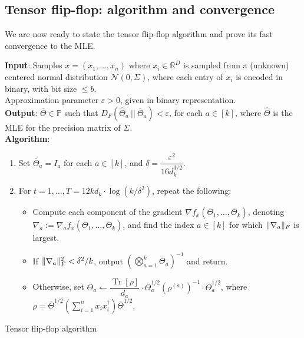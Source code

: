 \documentclass[aos]{imsart}
\theoremstyle{definition}
\numberwithin{equation}{section}
\DeclareMathOperator{\tr}{Tr}
\DeclarePairedDelimiter{\norm}{\lVert}{\rVert}
\newcommand{\R}{{\mathbb{R}}}
\newcommand{\otheta}{\overline{\Theta}}
\newcommand{\htheta}{\widehat{\Theta}}
\newcommand{\eps}{\varepsilon}
\newcommand{\cN}{\mathcal{N}}
\newcommand{\SPD}{\mathbb{P}}
\newcommand{\samp}{x}
\begin{document}
\subsection{Tensor flip-flop: algorithm and convergence}

We are now ready to state the tensor flip-flop algorithm and prove its fast convergence to the MLE.

\begin{Algorithm}
\textbf{Input}: Samples $\samp = (\samp_1, \ldots, \samp_n)$ where $\samp_i \in \R^D$ is sampled from a (unknown) centered normal distribution $\cN(0, \Sigma)$, where each entry of $\samp_i$ is encoded in binary, with bit size $\le b$. \\ Approximation parameter $\eps > 0$, given in binary representation. \\[.3ex]

\textbf{Output}: $\otheta \in \SPD$ such that $D_F(\htheta_a \ || \ \otheta_a) < \eps$, for each $a \in [k]$, where $\htheta$ is the MLE for the precision matrix of $\Sigma$. \\[.3ex]

\textbf{Algorithm}:
\begin{enumerate}
\item\label{it:flip-flop step 1} Set $\otheta_a = I_a$ for each $a \in [k]$, and $\delta = \dfrac{\eps^2}{16 d_k^{3/2}}$.
\item\label{it:flip-flop step 2} For $t=1,\dots,T = 12 k d_k \cdot \log(k/\delta^2)$, repeat the following:
\begin{itemize}
\item Compute each component of the gradient $\nabla f_{\samp}(\otheta_1, \ldots, \otheta_k)$, denoting $\nabla_a := \nabla_a f_{\samp}(\otheta_1, \ldots, \otheta_k)$, and find the index $a \in [k]$ for which $\norm{\nabla_a}_F$ is largest.
\item
If $\norm{\nabla_a}_F^2 < \delta^2/k$, output $\left( \bigotimes_{a =1}^k \otheta_a \right)^{-1}$ and return.
\item Otherwise, set $\otheta_a \leftarrow  \dfrac{\tr[\rho]}{d_a} \cdot \otheta_a^{1/2} (\rho^{(a)})^{-1} \cdot \otheta_a^{1/2}$, where $\rho = \otheta^{1/2} \left( \sum_{i=1}^n x_ix_i^\dagger \right) \otheta^{1/2}.$
\end{itemize}
\end{enumerate}
\caption{Tensor flip-flop algorithm}\label{alg:flip-flop}
\end{Algorithm}
\end{document}
